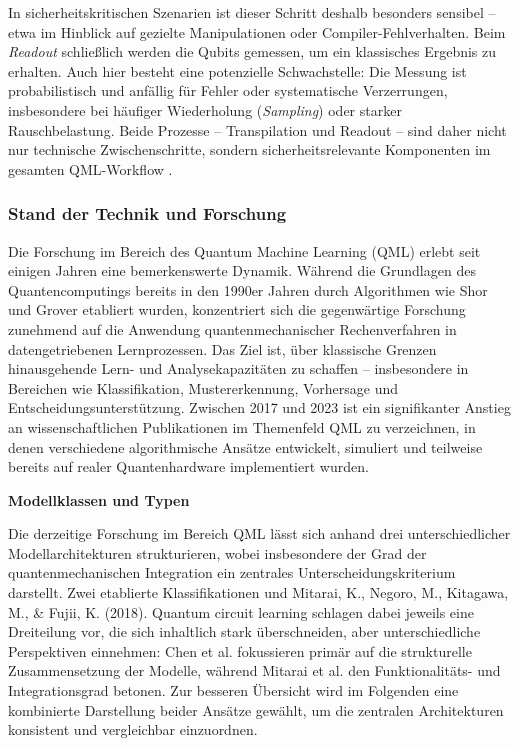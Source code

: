 In sicherheitskritischen Szenarien ist dieser Schritt deshalb besonders sensibel – etwa im Hinblick auf gezielte Manipulationen oder Compiler-Fehlverhalten. Beim \textit{Readout} schließlich werden die Qubits gemessen, um ein klassisches Ergebnis zu erhalten. Auch hier besteht eine potenzielle Schwachstelle: Die Messung ist probabilistisch und anfällig für Fehler oder systematische Verzerrungen, insbesondere bei häufiger Wiederholung (\textit{Sampling}) oder starker Rauschbelastung. Beide Prozesse – Transpilation und Readout – sind daher nicht nur technische Zwischenschritte, sondern sicherheitsrelevante Komponenten im gesamten QML-Workflow \cite{willeIBMsQiskitTool2019}.

\vspace{0.5cm}


\subsubsection{Stand der Technik und Forschung}
\noindent
Die Forschung im Bereich des Quantum Machine Learning (QML) erlebt seit einigen Jahren eine bemerkenswerte Dynamik. Während die Grundlagen des Quantencomputings bereits in den 1990er Jahren durch Algorithmen wie Shor und Grover etabliert wurden, konzentriert sich die gegenwärtige Forschung zunehmend auf die Anwendung quantenmechanischer Rechenverfahren in datengetriebenen Lernprozessen. Das Ziel ist, über klassische Grenzen hinausgehende Lern- und Analysekapazitäten zu schaffen – insbesondere in Bereichen wie Klassifikation, Mustererkennung, Vorhersage und Entscheidungsunterstützung. Zwischen 2017 und 2023 ist ein signifikanter Anstieg an wissenschaftlichen Publikationen im Themenfeld QML zu verzeichnen, in denen verschiedene algorithmische Ansätze entwickelt, simuliert und teilweise bereits auf realer Quantenhardware implementiert wurden. \cite{peral-garciaSystematicLiteratureReview2024}

\vspace{1em}
\noindent\textbf{Modellklassen und Typen}

\noindent
Die derzeitige Forschung im Bereich QML lässt sich anhand drei unterschiedlicher Modellarchitekturen strukturieren, wobei insbesondere der Grad der quantenmechanischen Integration ein zentrales Unterscheidungskriterium darstellt. Zwei etablierte Klassifikationen \cite{chengNoisyIntermediatescaleQuantum2023} und Mitarai, K., Negoro, M., Kitagawa, M., & Fujii, K. (2018). Quantum circuit learning 
schlagen dabei jeweils eine Dreiteilung vor, die sich inhaltlich stark überschneiden, aber unterschiedliche Perspektiven einnehmen: Chen et al. fokussieren primär auf die strukturelle Zusammensetzung der Modelle, während Mitarai et al. den Funktionalitäts- und Integrationsgrad betonen.
Zur besseren Übersicht wird im Folgenden eine kombinierte Darstellung beider Ansätze gewählt, um die zentralen Architekturen konsistent und vergleichbar einzuordnen.

